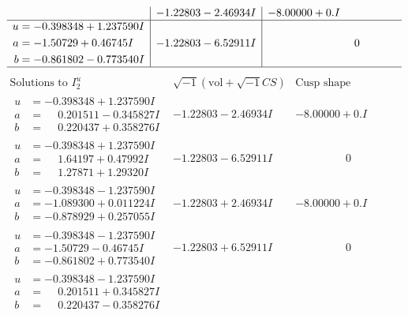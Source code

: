 \documentclass[1p]{elsarticle_modified}
\theoremstyle{definition}
\newcommand{\I}{\sqrt{-1}}
\begin{document}
$$\begin{array}{c|c|c}
 & -1.22803 - 2.46934 I & -8.00000 + 0. I\phantom{ +0.000000I} \\ \hline\begin{aligned}
u &= -0.398348 + 1.237590 I \\
a &= -1.50729 + 0.46745 I \\
b &= -0.861802 - 0.773540 I\end{aligned}
 & -1.22803 - 6.52911 I & \phantom{-0.000000 } 0\\
 \hline 
 \end{array}$$\newpage$$\begin{array}{c|c|c}  
\text{Solutions to }I^u_{2}& \I (\text{vol} + \sqrt{-1}CS) & \text{Cusp shape}\\
 \hline 
\begin{aligned}
u &= -0.398348 + 1.237590 I \\
a &= \phantom{-}0.201511 - 0.345827 I \\
b &= \phantom{-}0.220437 + 0.358276 I\end{aligned}
 & -1.22803 - 2.46934 I & -8.00000 + 0. I\phantom{ +0.000000I} \\ \hline\begin{aligned}
u &= -0.398348 + 1.237590 I \\
a &= \phantom{-}1.64197 + 0.47992 I \\
b &= \phantom{-}1.27871 + 1.29320 I\end{aligned}
 & -1.22803 - 6.52911 I & \phantom{-0.000000 } 0 \\ \hline\begin{aligned}
u &= -0.398348 - 1.237590 I \\
a &= -1.089300 + 0.011224 I \\
b &= -0.878929 + 0.257055 I\end{aligned}
 & -1.22803 + 2.46934 I & -8.00000 + 0. I\phantom{ +0.000000I} \\ \hline\begin{aligned}
u &= -0.398348 - 1.237590 I \\
a &= -1.50729 - 0.46745 I \\
b &= -0.861802 + 0.773540 I\end{aligned}
 & -1.22803 + 6.52911 I & \phantom{-0.000000 } 0 \\ \hline\begin{aligned}
u &= -0.398348 - 1.237590 I \\
a &= \phantom{-}0.201511 + 0.345827 I \\
b &= \phantom{-}0.220437 - 0.358276 I\end{aligned}

\end{array}$$
\end{document}
